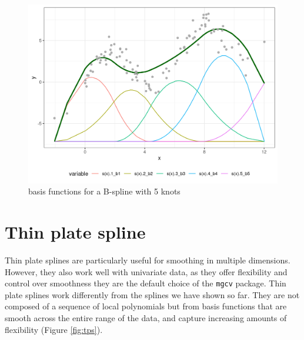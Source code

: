 \documentclass[
]{book}
\newenvironment{Shaded}{\begin{snugshade}}{\end{snugshade}}
\newcommand{\AttributeTok}[1]{\textcolor[rgb]{0.13,0.29,0.53}{#1}}
\newcommand{\CommentTok}[1]{\textcolor[rgb]{0.56,0.35,0.01}{\textit{#1}}}
\newcommand{\DecValTok}[1]{\textcolor[rgb]{0.00,0.00,0.81}{#1}}
\newcommand{\FunctionTok}[1]{\textcolor[rgb]{0.13,0.29,0.53}{\textbf{#1}}}
\newcommand{\NormalTok}[1]{#1}
\newcommand{\OtherTok}[1]{\textcolor[rgb]{0.56,0.35,0.01}{#1}}
\newcommand{\SpecialCharTok}[1]{\textcolor[rgb]{0.81,0.36,0.00}{\textbf{#1}}}
\newcommand{\StringTok}[1]{\textcolor[rgb]{0.31,0.60,0.02}{#1}}
\begin{document}
\begin{figure}
\centering
\includegraphics{_bookdown_files/_main_files/figure-html/splinebasisandmodel-1.png}
\caption{\label{fig:splinebasisandmodel}basis functions for a B-spline with 5 knots}
\end{figure}

\hypertarget{thin-plate-spline}{%
\section{Thin plate spline}\label{thin-plate-spline}}

Thin plate splines are particularly useful for smoothing in multiple dimensions. However, they also work well with univariate data, as they offer flexibility and control over smoothness they are the default choice of the \texttt{mgcv} package. Thin plate splines work differently from the splines we have shown so far. They are not composed of a sequence of local polynomials but from basis functions that are smooth across the entire range of the data, and capture increasing amounts of flexibility (Figure \ref{fig:tps}).

\begin{Shaded}
\end{Shaded}
\end{document}
